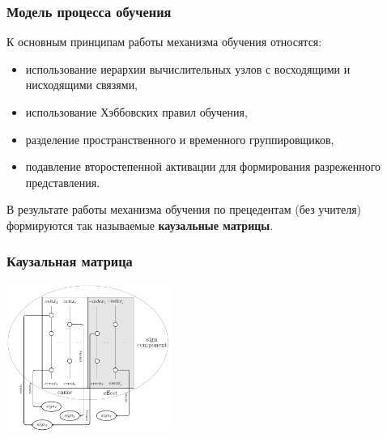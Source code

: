\documentclass[default]{beamer}
\begin{document}
	\begin{frame}
		\frametitle{Модель процесса обучения}
		
		К основным принципам работы механизма обучения относятся: 
		
		\begin{itemize}
			\item использование иерархии вычислительных узлов с восходящими и нисходящими связями, 
			\item использование Хэббовских правил обучения, 
			\item разделение пространственного и временного группировщиков, 
			\item подавление второстепенной активации для формирования разреженного представления.
		\end{itemize}
		
		В результате работы механизма обучения по прецедентам (без учителя) формируются так называемые \textbf{каузальные матрицы}.
		\vfill
		\nocite{*}
		\printbibliography[keyword={htm}, resetnumbers=true]
	\end{frame}
	
	\begin{frame}
		\frametitle{Каузальная матрица}                             
		\centering
		\includegraphics[width=0.4\textwidth]{automata/caus_matr}
		\vspace{10pt}
		\nocite{*}
		\printbibliography[keyword={per}, resetnumbers=true]
	\end{frame}
		
\end{document}
